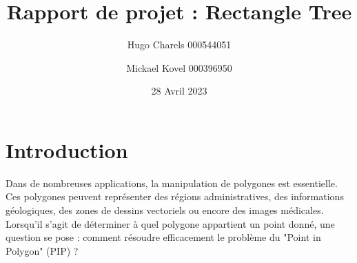 \documentclass {article}
\begin{document}
\begin{figure}[t]
	\label{fig:logo}
\end{figure}
\author {Hugo Charels 000544051 \and Mickael Kovel 000396950}
\date {28 Avril 2023}
\title {Rapport de projet : Rectangle Tree}

\maketitle
\newpage


\tableofcontents
\newpage
\section {Introduction}

Dans de nombreuses applications, la manipulation de polygones est essentielle. Ces polygones peuvent représenter 
des régions administratives, des informations géologiques, des zones de dessins vectoriels ou encore des 
images médicales. Lorsqu'il s'agit de déterminer à quel polygone appartient un point donné, une question se pose : 
comment résoudre efficacement le problème du "Point in Polygon" (PIP) ?
\end{document}
